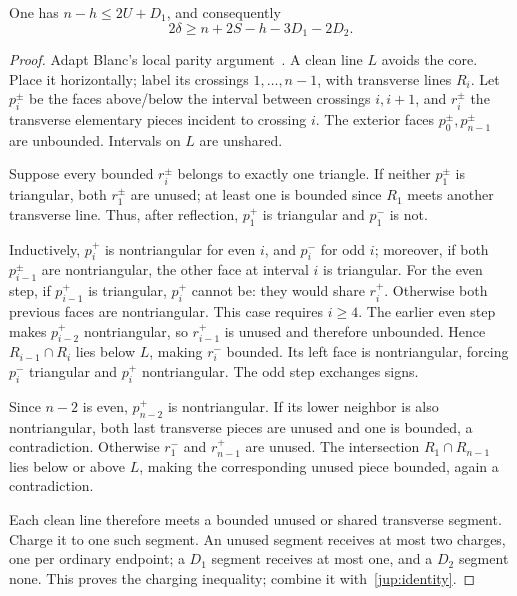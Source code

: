\begin{lemma}
\label{jup:clean}
One has $n-h\le2U+D_1$, and consequently
\begin{equation}
 2\delta\ge n+2S-h-3D_1-2D_2.
 \label{jup:budget}
\end{equation}
\end{lemma}
\begin{proof}
Adapt Blanc's local parity argument~\cite{blanc2011}. A clean line $L$ avoids the core. Place it horizontally; label its crossings $1,\ldots,n-1$, with transverse lines $R_i$. Let $p_i^\pm$ be the faces above/below the interval between crossings $i,i+1$, and $r_i^\pm$ the transverse elementary pieces incident to crossing $i$. The exterior faces $p_0^\pm,p_{n-1}^\pm$ are unbounded. Intervals on $L$ are unshared.

Suppose every bounded $r_i^\pm$ belongs to exactly one triangle. If neither $p_1^\pm$ is triangular, both $r_1^\pm$ are unused; at least one is bounded since $R_1$ meets another transverse line. Thus, after reflection, $p_1^+$ is triangular and $p_1^-$ is not.

Inductively, $p_i^+$ is nontriangular for even $i$, and $p_i^-$ for odd $i$; moreover, if both $p_{i-1}^\pm$ are nontriangular, the other face at interval $i$ is triangular. For the even step, if $p_{i-1}^+$ is triangular, $p_i^+$ cannot be: they would share $r_i^+$. Otherwise both previous faces are nontriangular. This case requires $i\ge4$. The earlier even step makes $p_{i-2}^+$ nontriangular, so $r_{i-1}^+$ is unused and therefore unbounded. Hence $R_{i-1}\cap R_i$ lies below $L$, making $r_i^-$ bounded. Its left face is nontriangular, forcing $p_i^-$ triangular and $p_i^+$ nontriangular. The odd step exchanges signs.

Since $n-2$ is even, $p_{n-2}^+$ is nontriangular. If its lower neighbor is also nontriangular, both last transverse pieces are unused and one is bounded, a contradiction. Otherwise $r_1^-$ and $r_{n-1}^+$ are unused. The intersection $R_1\cap R_{n-1}$ lies below or above $L$, making the corresponding unused piece bounded, again a contradiction.

Each clean line therefore meets a bounded unused or shared transverse segment. Charge it to one such segment. An unused segment receives at most two charges, one per ordinary endpoint; a $D_1$ segment receives at most one, and a $D_2$ segment none. This proves the charging inequality; combine it with~\eqref{jup:identity}.
\end{proof}

